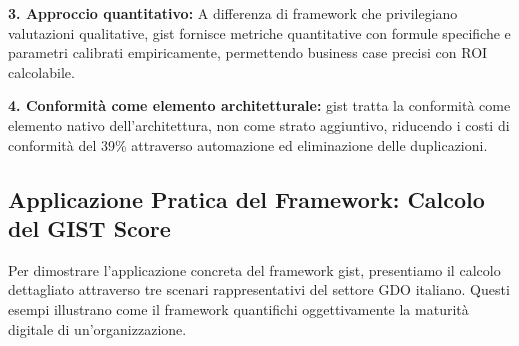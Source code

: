 \textbf{3. Approccio quantitativo:} A differenza di framework che privilegiano valutazioni qualitative, \gls{gist} fornisce metriche quantitative con formule specifiche e parametri calibrati empiricamente, permettendo business case precisi con ROI calcolabile.

\textbf{4. Conformità come elemento architetturale:} \gls{gist} tratta la conformità come elemento nativo dell'architettura, non come strato aggiuntivo, riducendo i costi di conformità del 39\% attraverso automazione ed eliminazione delle duplicazioni.

\subsection{\texorpdfstring{Applicazione Pratica del Framework: Calcolo del GIST Score}{5.3.4 - Applicazione Pratica del Framework: Calcolo del GIST Score}}
\label{subsec:5.3.4}

Per dimostrare l'applicazione concreta del framework \gls{gist}, presentiamo il calcolo dettagliato attraverso tre scenari rappresentativi del settore GDO italiano. Questi esempi illustrano come il framework quantifichi oggettivamente la maturità digitale di un'organizzazione.

